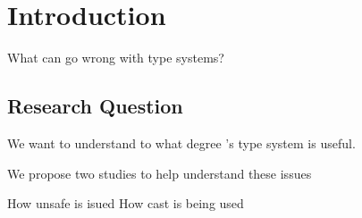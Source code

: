 
\chapter{Introduction}

What can go wrong with type systems?




\section{Research Question}

We want to understand to what degree \java{}'s type system is useful.


We propose two studies to help understand these issues

How unsafe is isued
How cast is being used



